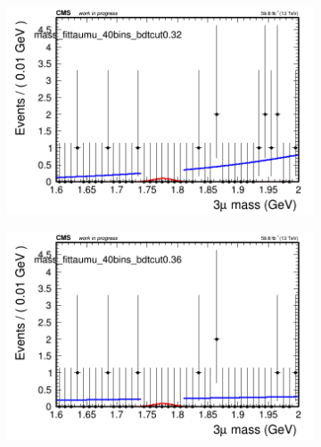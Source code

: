 \begin{figure}[H]
\begin{subfigure}{0.2\textwidth}
        \caption{}
    \end{subfigure}
    \begin{subfigure}{0.2\textwidth}
        \includegraphics[width=\textwidth]{power_law/plots/taumu/massfit_taumu_40bins_bdtcut0.32.png}
        \caption{}
    \end{subfigure}
    \begin{subfigure}{0.2\textwidth}
        \includegraphics[width=\textwidth]{power_law/plots/taumu/massfit_taumu_40bins_bdtcut0.36.png}
        \caption{}
    \end{subfigure}
    \begin{subfigure}{0.2\textwidth}

\end{subfigure}
\end{figure}
